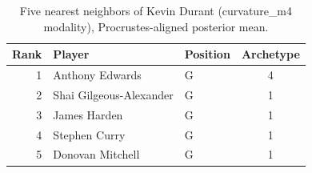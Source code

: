 \begin{table}[htbp]
  \centering\small
  \begin{tabular}{rllc}
    \toprule
    Rank & Player & Position & Archetype \\
    \midrule
    1 & Anthony Edwards & G & 4 \\
    2 & Shai Gilgeous-Alexander & G & 1 \\
    3 & James Harden & G & 1 \\
    4 & Stephen Curry & G & 1 \\
    5 & Donovan Mitchell & G & 1 \\
    \bottomrule
  \end{tabular}
  \caption{Five nearest neighbors of Kevin Durant (curvature_m4 modality), Procrustes-aligned posterior mean.}
  \label{tab:Kevin_Durant_neighbors_curvature_m4}
\end{table}

